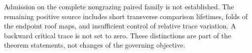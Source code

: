 \documentclass[11pt,reqno]{amsart}
\numberwithin{equation}{section}
\theoremstyle{definition}
\theoremstyle{remark}\newtheorem{remark}[theorem]{Remark}
\begin{document}
Admission on the complete nongrazing paired family is not established.
The remaining positive source includes short transverse comparison
lifetimes, folds of the endpoint roof maps, and insufficient control
of relative trace variation. A backward critical trace is not set to
zero. These distinctions are part of the theorem statements, not
changes of the governing objective.






\appendix


\end{document}
